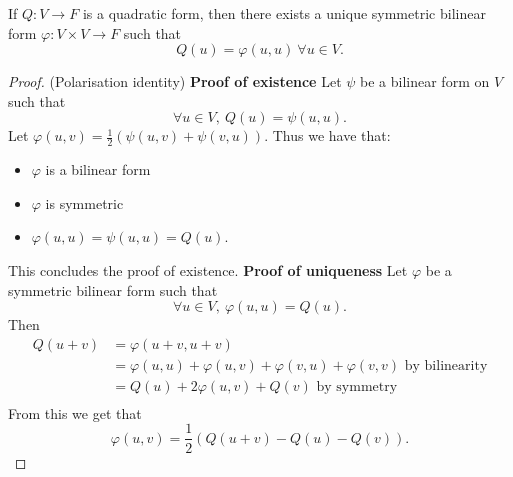 \documentclass[a4paper]{scrartcl}
\begin{document}
\begin{proposition}
     If $Q: V \rightarrow F$ is a quadratic form, then there exists a unique symmetric bilinear form $\varphi: V \times V \rightarrow F $ such that 
     \[Q(u)=\varphi (u,u) \ \forall u \in V.\]
\end{proposition}
\begin{proof}(Polarisation identity)\newline 
     \textbf{Proof of existence}\newline 
     Let $\psi$ be a bilinear form on $V$ such that 
     \[\forall u \in V, \ Q(u)=\psi (u,u).\]
     Let $\varphi (u,v)=\frac{1}{2} (\psi (u,v)+ \psi (v,u))$. Thus we have that:
     \begin{itemize}
         \item $\varphi$ is a bilinear form
         \item $\varphi$ is symmetric
         \item $\varphi (u,u)=\psi (u,u)=Q (u)$.
     \end{itemize}
     This concludes the proof of existence.\newline 
     \textbf{Proof of uniqueness}\newline 
     Let $\varphi$ be a symmetric bilinear form such that 
     \[\forall u \in V, \ \varphi (u,u)=Q(u).\]
     Then 
     \begin{equation*}
          \begin{split}
            Q (u+v)&=\varphi (u+v,u+v)\\
            &=\varphi (u,u)+ \varphi (u,v)+\varphi (v,u)+ \varphi (v,v) \text{ by bilinearity} \\
            &=Q(u)+ 2\varphi (u,v)+Q(v) \text{ by symmetry}\\
          \end{split}
     \end{equation*}
     From this we get that 
     \[\varphi(u,v)=\frac{1}{2} (Q (u+v)-Q (u)- Q (v)).\]
\end{proof}
\end{document}
